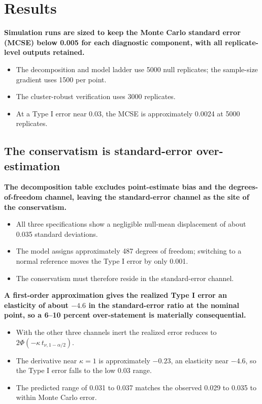 \documentclass[
  11pt,
]{article}
\begin{document}
\section{Results}\label{results}

\textbf{Simulation runs are sized to keep the Monte Carlo standard error (MCSE) below 0.005 for each diagnostic component, with all replicate-level outputs retained.}

\begin{itemize}\setlength{\itemsep}{2pt}\setlength{\parskip}{0pt}
\item The decomposition and model ladder use 5000 null replicates; the sample-size gradient uses 1500 per point.
\item The cluster-robust verification uses 3000 replicates.
\item At a Type I error near 0.03, the MCSE is approximately 0.0024 at 5000 replicates.
\end{itemize}

\subsection{The conservatism is standard-error over-estimation}\label{the-conservatism-is-standard-error-over-estimation}

\textbf{The decomposition table excludes point-estimate bias and the degrees-of-freedom channel, leaving the standard-error channel as the site of the conservatism.}

\begin{itemize}\setlength{\itemsep}{2pt}\setlength{\parskip}{0pt}
\item All three specifications show a negligible null-mean displacement of about 0.035 standard deviations.
\item The model assigns approximately 487 degrees of freedom; switching to a normal reference moves the Type I error by only 0.001.
\item The conservatism must therefore reside in the standard-error channel.
\end{itemize}

\textbf{A first-order approximation gives the realized Type I error an elasticity of about $-4.6$ in the standard-error ratio at the nominal point, so a 6--10 percent over-statement is materially consequential.}

\begin{itemize}\setlength{\itemsep}{2pt}\setlength{\parskip}{0pt}
\item With the other three channels inert the realized error reduces to $2\Phi(-\kappa\,t_{\nu,1-\alpha/2})$.
\item The derivative near $\kappa = 1$ is approximately $-0.23$, an elasticity near $-4.6$, so the Type I error falls to the low 0.03 range.
\item The predicted range of 0.031 to 0.037 matches the observed 0.029 to 0.035 to within Monte Carlo error.
\end{itemize}
\end{document}
